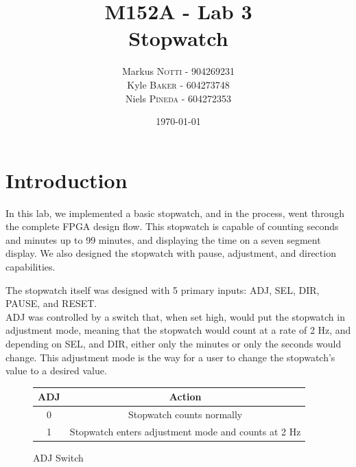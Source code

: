 \documentclass{article}
\title{M152A - Lab 3 \\ Stopwatch} %
\author{Markus \textsc{Notti} - 904269231 \\ Kyle \textsc{Baker}  - 604273748 \\ Niels \textsc{Pineda} - 604272353} %
\date{\today} %
\begin{document}
\maketitle %


\section*{Introduction}


In this lab, we implemented a basic stopwatch, and in the process, went through the complete FPGA design flow. This stopwatch is capable of counting seconds and minutes up to 99 minutes, and displaying the time on a seven segment display. We also designed the stopwatch with pause, adjustment, and direction capabilities.  

The stopwatch itself was designed with 5 primary inputs: ADJ, SEL, DIR, PAUSE, and RESET.\\

ADJ was controlled by a switch that, when set high, would put the stopwatch in adjustment mode, meaning that the stopwatch would count at a rate of 2 Hz, and depending on SEL, and DIR, either only the minutes or only the seconds would change.  This adjustment mode is the way for a user to change the stopwatch's value to a desired value. \\

\begin{figure}[H]

\begin{center}
\begin{tabular}{ | c | c | }
\hline
\textbf{ADJ} & \textbf{Action} \\ 
\hline
0 & Stopwatch counts normally\\
\hline
1 & Stopwatch enters adjustment mode and counts at 2 Hz\\
\hline
\end{tabular}

\caption{ADJ Switch}

\end{center}
\end{figure}
\end{document}
